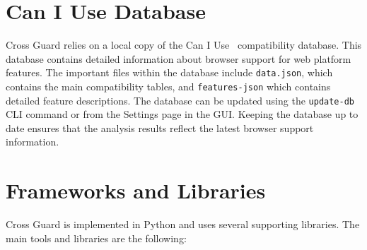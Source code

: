 \section{Can I Use Database}
\label{sec:caniuse-db}

Cross Guard relies on a local copy of the Can I Use~\cite{caniuse} compatibility database. This database contains detailed information about browser support for web platform features. The important files within the database include \texttt{data.json}, which contains the main compatibility tables, and \texttt{features-json} which contains detailed feature descriptions. The database can be updated using the \texttt{update-db} CLI command or from the Settings page in the GUI. Keeping the database up to date ensures that the analysis results reflect the latest browser support information.

\section{Frameworks and Libraries}
\label{sec:frameworks}

Cross Guard is implemented in Python and uses several supporting libraries. The main tools and libraries are the following:

